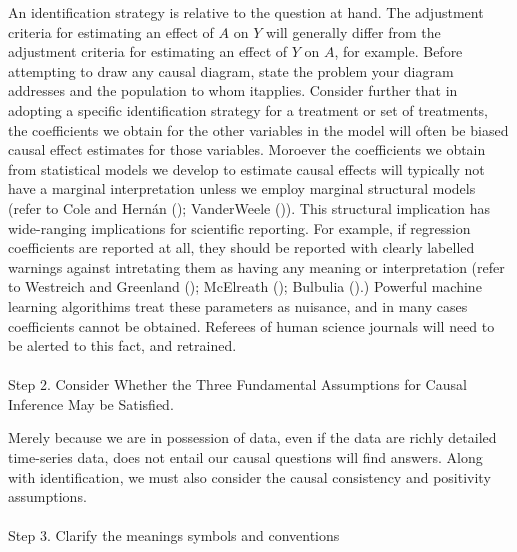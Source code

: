 \documentclass[
  single column]{article}
\makeatletter
\let\oldparagraph\paragraph
\renewcommand{\paragraph}{
    \@ifstar
      \xxxParagraphStar
      \xxxParagraphNoStar
  }
\newcommand{\xxxParagraphStar}[1]{\oldparagraph*{#1}\mbox{}}
\newcommand{\xxxParagraphNoStar}[1]{\oldparagraph{#1}\mbox{}}
\makeatother
\begin{document}
An identification strategy is relative to the question at hand. The
adjustment criteria for estimating an effect of \(A\) on \(Y\) will
generally differ from the adjustment criteria for estimating an effect
of \(Y\) on \(A\), for example. Before attempting to draw any causal
diagram, state the problem your diagram addresses and the population to
whom itapplies. Consider further that in adopting a specific
identification strategy for a treatment or set of treatments, the
coefficients we obtain for the other variables in the model will often
be biased causal effect estimates for those variables. Moroever the
coefficients we obtain from statistical models we develop to estimate
causal effects will typically not have a marginal interpretation unless
we employ marginal structural models (refer to Cole and Hernán
(); VanderWeele
()). This structural implication
has wide-ranging implications for scientific reporting. For example, if
regression coefficients are reported at all, they should be reported
with clearly labelled warnings against intretating them as having any
meaning or interpretation (refer to Westreich and Greenland
(); McElreath
(); Bulbulia
().) Powerful machine learning
algorithims treat these parameters as nuisance, and in many cases
coefficients cannot be obtained. Referees of human science journals will
need to be alerted to this fact, and retrained.

\paragraph{Step 2. Consider Whether the Three Fundamental Assumptions
for Causal Inference May be
Satisfied.}\label{step-2.-consider-whether-the-three-fundamental-assumptions-for-causal-inference-may-be-satisfied.}

Merely because we are in possession of data, even if the data are richly
detailed time-series data, does not entail our causal questions will
find answers. Along with identification, we must also consider the
causal consistency and positivity assumptions.

\paragraph{Step 3. Clarify the meanings symbols and
conventions}\label{step-3.-clarify-the-meanings-symbols-and-conventions}
\end{document}
